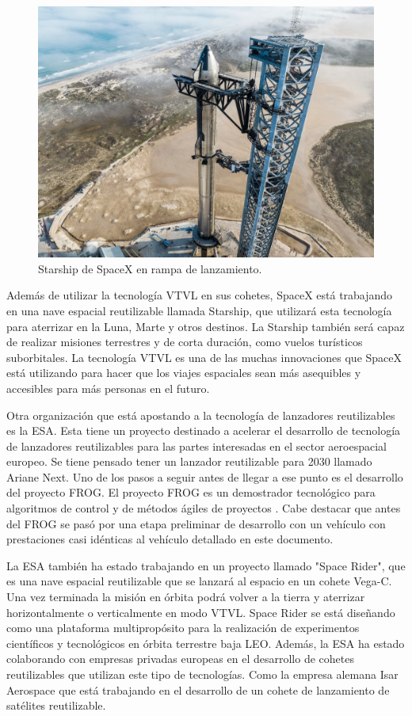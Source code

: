 \begin{figure}[htb]
    \centering
    \includegraphics[width=0.8\linewidth]{fig/starhip2.png}
    \caption{Starship de SpaceX en rampa de lanzamiento.}
    \label{fig:starshipcool}
\end{figure}


Además de utilizar la tecnología VTVL en sus cohetes, SpaceX está trabajando en una nave espacial reutilizable llamada Starship, que utilizará esta tecnología para aterrizar en la Luna, Marte y otros destinos. La Starship también será capaz de realizar misiones terrestres y de corta duración, como vuelos turísticos suborbitales. La tecnología VTVL es una de las muchas innovaciones que SpaceX está utilizando para hacer que los viajes espaciales sean más asequibles y accesibles para más personas en el futuro.

\medskip

Otra organización que está apostando a la tecnología de lanzadores reutilizables es la ESA. Esta tiene un proyecto destinado a acelerar el desarrollo de tecnología de lanzadores reutilizables para las partes interesadas en el sector aeroespacial europeo. Se tiene pensado tener un lanzador reutilizable para 2030 llamado Ariane Next. Uno de los pasos a seguir antes de llegar a ese punto es el desarrollo del proyecto FROG. El proyecto FROG es un demostrador tecnológico para algoritmos de control y de métodos ágiles de proyectos \cite{rmili2019frog}. Cabe destacar que antes del FROG se pasó por una etapa preliminar de desarrollo con un vehículo con prestaciones casi idénticas al vehículo detallado en este documento. 

La ESA también ha estado trabajando en un proyecto llamado "Space Rider", que es una nave
espacial reutilizable que se lanzará al espacio en un cohete Vega-C. Una vez terminada la misión en órbita podrá volver a la tierra y aterrizar horizontalmente o verticalmente en modo VTVL. Space Rider se está diseñando como una
plataforma multipropósito para la realización de experimentos científicos y tecnológicos en órbita
terrestre baja LEO. Además, la ESA ha estado colaborando con empresas privadas europeas en el
desarrollo de cohetes reutilizables que utilizan este tipo de tecnologías. Como la empresa alemana Isar
Aerospace que está trabajando en el desarrollo de un cohete de lanzamiento de satélites reutilizable.

